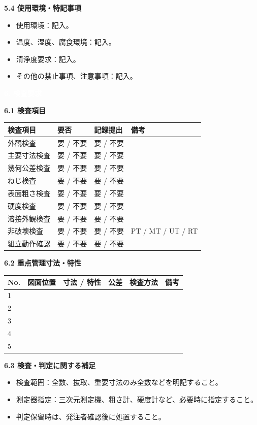 \documentclass[a4paper,10pt]{ltjsarticle}
\makeatletter
\newlength{\SpecBodyWidth}
\newcommand{\PageTitle}[1]{%
  \vspace*{2mm}%
  \noindent\colorbox{SpecHead}{%
    \parbox{\dimexpr\SpecBodyWidth-2\fboxsep\relax}{%
      \large\bfseries\textcolor{white}{#1}%
    }%
  }%
  \par\vspace{5mm}%
}
\newcommand{\BlockTitle}[1]{%
  \vspace{4mm}%
  \noindent\colorbox{SpecSoft}{%
    \parbox{\dimexpr\SpecBodyWidth-2\fboxsep\relax}{%
      \normalsize\bfseries\textcolor{SpecHead}{#1}%
    }%
  }%
  \par\vspace{1.5mm}%
}
\newcommand{\Note}[1]{%
  \vspace{1.5mm}%
  \noindent\fbox{%
    \parbox{\dimexpr\SpecBodyWidth-2\fboxsep-2\fboxrule\relax}{%
      \footnotesize\textcolor{SpecMuted}{#1}%
    }%
  }%
  \par\vspace{1.5mm}%
}
\newenvironment{SpecTable}[1]{%
  \par\vspace{1mm}%
  \noindent\footnotesize%
  \renewcommand{\arraystretch}{1.10}%
  \setlength{\tabcolsep}{3.0pt}%
  \begin{tabular*}{\SpecBodyWidth}{@{\extracolsep{\fill}}#1@{}}%
}{%
  \end{tabular*}%
  \par\vspace{1.5mm}%
}
\newcommand{\Head}[1]{\textbf{\textcolor{SpecHead}{#1}}}
\newcommand{\YN}{要 / 不要}
\makeatother
\begin{document}
\BlockTitle{5.4 使用環境・特記事項}
\begin{itemize}
  \item 使用環境：記入。
  \item 温度、湿度、腐食環境：記入。
  \item 清浄度要求：記入。
  \item その他の禁止事項、注意事項：記入。
\end{itemize}

\clearpage

\PageTitle{6. 検査要求}

\BlockTitle{6.1 検査項目}
\begin{SpecTable}{|p{48mm}|p{22mm}|p{24mm}|p{52mm}|}
\hline
\Head{検査項目} & \Head{要否} & \Head{記録提出} & \Head{備考} \\
\hline
外観検査 & \YN & \YN &  \\
\hline
主要寸法検査 & \YN & \YN &  \\
\hline
幾何公差検査 & \YN & \YN &  \\
\hline
ねじ検査 & \YN & \YN &  \\
\hline
表面粗さ検査 & \YN & \YN &  \\
\hline
硬度検査 & \YN & \YN &  \\
\hline
溶接外観検査 & \YN & \YN &  \\
\hline
非破壊検査 & \YN & \YN & PT / MT / UT / RT \\
\hline
組立動作確認 & \YN & \YN &  \\
\hline
\end{SpecTable}

\BlockTitle{6.2 重点管理寸法・特性}
\begin{SpecTable}{|p{8mm}|p{22mm}|p{44mm}|p{20mm}|p{28mm}|p{24mm}|}
\hline
\Head{No.} & \Head{図面位置} & \Head{寸法 / 特性} & \Head{公差} & \Head{検査方法} & \Head{備考} \\
\hline
1 &  &  &  &  &  \\
\hline
2 &  &  &  &  &  \\
\hline
3 &  &  &  &  &  \\
\hline
4 &  &  &  &  &  \\
\hline
5 &  &  &  &  &  \\
\hline
\end{SpecTable}
\Note{検査成績書が必要な場合は、測定値、使用測定器、検査日、検査者を記録すること。}

\BlockTitle{6.3 検査・判定に関する補足}
\begin{itemize}
  \item 検査範囲：全数、抜取、重要寸法のみ全数などを明記すること。
  \item 測定器指定：三次元測定機、粗さ計、硬度計など、必要時に指定すること。
  \item 判定保留時は、発注者確認後に処置すること。
\end{itemize}
\end{document}
